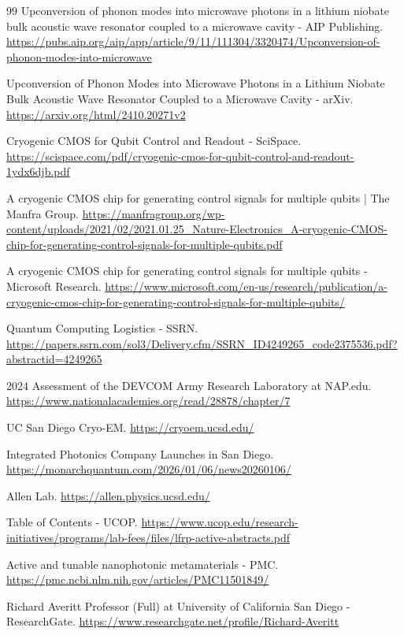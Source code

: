 \documentclass[11pt, a4paper]{article}
\begin{document}
\begin{thebibliography}{99}
 Upconversion of phonon modes into microwave photons in a lithium niobate bulk acoustic wave resonator coupled to a microwave cavity - AIP Publishing. \url{https://pubs.aip.org/aip/app/article/9/11/111304/3320474/Upconversion-of-phonon-modes-into-microwave}

 Upconversion of Phonon Modes into Microwave Photons in a Lithium Niobate Bulk Acoustic Wave Resonator Coupled to a Microwave Cavity - arXiv. \url{https://arxiv.org/html/2410.20271v2}

 Cryogenic CMOS for Qubit Control and Readout - SciSpace. \url{https://scispace.com/pdf/cryogenic-cmos-for-qubit-control-and-readout-1ydx6djb.pdf}

 A cryogenic CMOS chip for generating control signals for multiple qubits | The Manfra Group. \url{https://manfragroup.org/wp-content/uploads/2021/02/2021.01.25_Nature-Electronics_A-cryogenic-CMOS-chip-for-generating-control-signals-for-multiple-qubits.pdf}

 A cryogenic CMOS chip for generating control signals for multiple qubits - Microsoft Research. \url{https://www.microsoft.com/en-us/research/publication/a-cryogenic-cmos-chip-for-generating-control-signals-for-multiple-qubits/}

 Quantum Computing Logistics - SSRN. \url{https://papers.ssrn.com/sol3/Delivery.cfm/SSRN_ID4249265_code2375536.pdf?abstractid=4249265}

 2024 Assessment of the DEVCOM Army Research Laboratory at NAP.edu. \url{https://www.nationalacademies.org/read/28878/chapter/7}

 UC San Diego Cryo-EM. \url{https://cryoem.ucsd.edu/}

 Integrated Photonics Company Launches in San Diego. \url{https://monarchquantum.com/2026/01/06/news20260106/}

 Allen Lab. \url{https://allen.physics.ucsd.edu/}

 Table of Contents - UCOP. \url{https://www.ucop.edu/research-initiatives/programs/lab-fees/files/lfrp-active-abstracts.pdf}

 Active and tunable nanophotonic metamaterials - PMC. \url{https://pmc.ncbi.nlm.nih.gov/articles/PMC11501849/}

 Richard Averitt Professor (Full) at University of California San Diego - ResearchGate. \url{https://www.researchgate.net/profile/Richard-Averitt}


\end{thebibliography}
\end{document}
